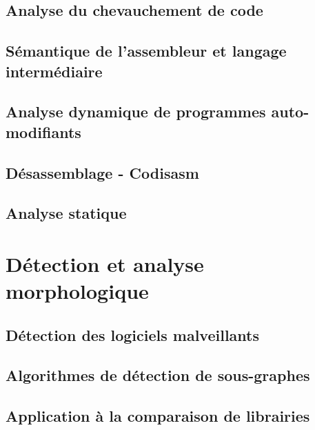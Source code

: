 \DontFrameThisInToc
\chapter{Analyse du chevauchement de code\label{chap:chevauchement}}


\DontFrameThisInToc
\chapter{Sémantique de l'assembleur et langage intermédiaire\label{chap:semantique}}


\DontFrameThisInToc
\chapter{Analyse dynamique de programmes auto-modifiants\label{chap:auto-modification}}


\DontFrameThisInToc
\chapter{Désassemblage - Codisasm\label{chap:desassembleur}}


\DontFrameThisInToc
\chapter{Analyse statique}
% 

\part{Détection et analyse morphologique}

\DontFrameThisInToc
\chapter{Détection des logiciels malveillants}


\DontFrameThisInToc
\chapter{Algorithmes de détection de sous-graphes}


\DontFrameThisInToc
\chapter{Application à la comparaison de librairies}



